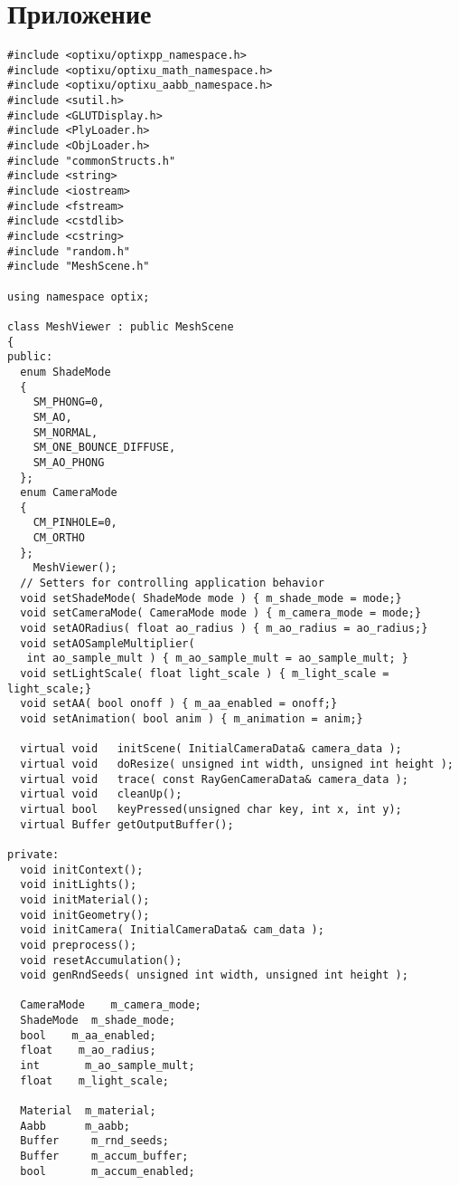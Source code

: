 \section*{\centering Приложение}
\begin{verbatim}
#include <optixu/optixpp_namespace.h>
#include <optixu/optixu_math_namespace.h>
#include <optixu/optixu_aabb_namespace.h>
#include <sutil.h>
#include <GLUTDisplay.h>
#include <PlyLoader.h>
#include <ObjLoader.h>
#include "commonStructs.h"
#include <string>
#include <iostream>
#include <fstream>
#include <cstdlib>
#include <cstring>
#include "random.h"
#include "MeshScene.h"

using namespace optix;

class MeshViewer : public MeshScene
{
public:
  enum ShadeMode
  {
    SM_PHONG=0,
    SM_AO,
    SM_NORMAL,
    SM_ONE_BOUNCE_DIFFUSE,
    SM_AO_PHONG
  };
  enum CameraMode
  {
    CM_PINHOLE=0,
    CM_ORTHO
  };
    MeshViewer();
  // Setters for controlling application behavior
  void setShadeMode( ShadeMode mode ) { m_shade_mode = mode;}
  void setCameraMode( CameraMode mode ) { m_camera_mode = mode;}
  void setAORadius( float ao_radius ) { m_ao_radius = ao_radius;}
  void setAOSampleMultiplier(
   int ao_sample_mult ) { m_ao_sample_mult = ao_sample_mult; }
  void setLightScale( float light_scale ) { m_light_scale = light_scale;}
  void setAA( bool onoff ) { m_aa_enabled = onoff;}
  void setAnimation( bool anim ) { m_animation = anim;}

  virtual void   initScene( InitialCameraData& camera_data );
  virtual void   doResize( unsigned int width, unsigned int height );
  virtual void   trace( const RayGenCameraData& camera_data );
  virtual void   cleanUp();
  virtual bool   keyPressed(unsigned char key, int x, int y);
  virtual Buffer getOutputBuffer();

private:
  void initContext();
  void initLights();
  void initMaterial();
  void initGeometry();
  void initCamera( InitialCameraData& cam_data );
  void preprocess();
  void resetAccumulation();
  void genRndSeeds( unsigned int width, unsigned int height );

  CameraMode    m_camera_mode;
  ShadeMode  m_shade_mode;
  bool    m_aa_enabled;
  float    m_ao_radius;
  int       m_ao_sample_mult;
  float    m_light_scale;

  Material  m_material;
  Aabb      m_aabb;
  Buffer     m_rnd_seeds;
  Buffer     m_accum_buffer;
  bool       m_accum_enabled;


\end{verbatim}
